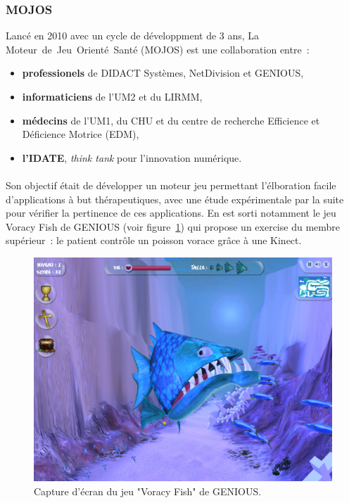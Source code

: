 
\subsubsection{MOJOS}
Lancé en 2010 avec un cycle de développment de 3 ans, 
La Moteur~de~Jeu~Orienté~Santé (MOJOS) est une collaboration entre~:
\begin{itemize}
\item \textbf{professionels} de DIDACT Systèmes, NetDivision et GENIOUS,
\item \textbf{informaticiens} de l'UM2 et du LIRMM,
\item \textbf{médecins} de l'UM1, du CHU et du centre 
de recherche Efficience et Déficience Motrice (EDM),
\item \textbf{l'IDATE}, \emph{think tank} pour l'innovation numérique.
\end{itemize}

\paragraph{}
Son objectif était de développer un moteur jeu permettant 
l'élboration facile d'applications à but thérapeutiques, avec une étude 
expérimentale
par la suite pour vérifier la pertinence de ces applications. En est sorti 
notamment le jeu Voracy Fish de GENIOUS (voir figure~\ref{fig:voracy_fish})
qui propose un exercise du membre supérieur~: le patient contrôle un poisson 
vorace grâce à une Kinect.

\begin{figure}[h!]
\centering
\includegraphics[width=0.8\linewidth]{images/voracy_fish}
\caption{Capture d'écran du jeu "Voracy Fish" de GENIOUS.}
\label{fig:voracy_fish}
\end{figure}

